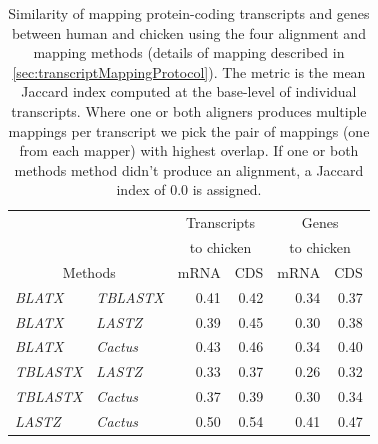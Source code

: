 \documentclass{article}
\begin{document}
\begin{table}[!htb]
\begin{center}
\begin{tabular}{l|l|r|r|r|r}
\multicolumn{2}{c}{}               &  \multicolumn{2}{c|}{Transcripts} & \multicolumn{2}{c}{Genes} \\
\multicolumn{2}{c}{}               & \multicolumn{2}{c|}{to chicken}& \multicolumn{2}{c}{to chicken} \\
\cmidrule{3-4}\cmidrule{5-6} 
\multicolumn{2}{c}{Methods}         & mRNA & CDS   & mRNA & CDS  \\
\midrule
\textit{BLATX}    & \textit{TBLASTX} & 0.41 & 0.42 & 0.34 &  0.37 \\
\textit{BLATX}    & \textit{LASTZ}   & 0.39 & 0.45 & 0.30 &  0.38 \\
\textit{BLATX}    & \textit{Cactus}  & 0.43 & 0.46 & 0.34 &  0.40 \\
\textit{TBLASTX}  & \textit{LASTZ}   & 0.33 & 0.37 & 0.26 &  0.32 \\
\textit{TBLASTX}  & \textit{Cactus}  & 0.37 & 0.39 & 0.30 &  0.34 \\
\textit{LASTZ}    & \textit{Cactus}  & 0.50 & 0.54 & 0.41 &  0.47 \\
\end{tabular}
\caption{Similarity of mapping protein-coding transcripts and genes between human and
chicken using the four alignment and mapping methods (details of mapping described in \ref{sec:transcriptMappingProtocol}).  The metric is the
mean Jaccard index computed at the base-level of individual
transcripts.  Where one or both aligners produces multiple mappings per transcript we pick the pair of mappings (one from each mapper) with highest overlap.  If one or both methods method didn't produce an
alignment, a Jaccard index of 0.0 is assigned.
}\label{tab:humanChickenTranscriptMappingMethodSim}
\end{center}
\end{table}
\end{document}
